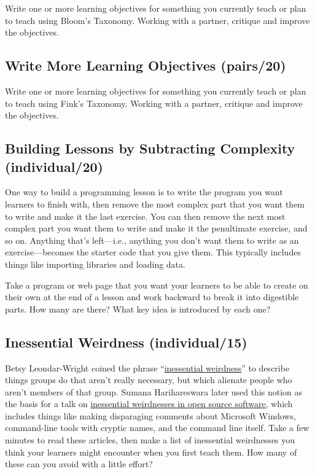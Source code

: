 Write one or more learning objectives for something you currently teach
or plan to teach using Bloom's Taxonomy. Working with a partner,
critique and improve the objectives.

\subsection*{Write More Learning Objectives (pairs/20)}

Write one or more learning objectives for something you currently teach
or plan to teach using Fink's Taxonomy. Working with a partner, critique
and improve the objectives.

\subsection*{Building Lessons by Subtracting Complexity (individual/20)}

One way to build a programming lesson is to write the program you want
learners to finish with, then remove the most complex part that you want
them to write and make it the last exercise. You can then remove the
next most complex part you want them to write and make it the
penultimate exercise, and so on. Anything that's left---i.e., anything you
don't want them to write as an exercise---becomes the starter code that
you give them. This typically includes things like importing libraries
and loading data.

Take a program or web page that you want your learners to be able to
create on their own at the end of a lesson and work backward to break it
into digestible parts. How many are there? What key idea is introduced
by each one?

\subsection*{Inessential Weirdness (individual/15)}

Betsy Leondar-Wright coined the phrase ``\href{http://www.classmatters.org/2006\_07/its-not-them.php}{inessential
weirdness}'' to describe things groups do that
aren't really necessary, but which alienate people who aren't members
of that group. Sumana Harihareswara later used this notion as the
basis for a talk on \href{https://www.harihareswara.net/sumana/2016/05/21/0}{inessential weirdnesses in open source
software}, which includes things
like making disparaging comments about Microsoft Windows, command-line
tools with cryptic names, and the command line itself. Take a few
minutes to read these articles, then make a list of inessential
weirdnesses you think your learners might encounter when you first
teach them. How many of these can you avoid with a little effort?

